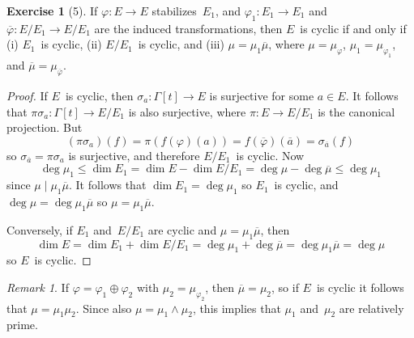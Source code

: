 \documentclass[letterpaper,12pt]{article}
\newcommand{\divides}{\mid}
\newcommand{\meet}{\wedge}
\newcommand{\dsum}{\oplus}
\newcommand{\proj}[1]{\overline{#1}}
\theoremstyle{definition}
\newtheorem*{exer}{Exercise}
\theoremstyle{remark}
\newtheorem*{rmk}{Remark}
\begin{document}
\begin{exer}[5]
If \(\varphi:E\to E\) stabilizes~\(E_1\), and \(\varphi_1:E_1\to E_1\) and \(\proj{\varphi}:E/E_1\to E/E_1\) are the induced transformations, then \(E\)~is cyclic if and only if (i) \(E_1\)~is cyclic, (ii) \(E/E_1\)~is cyclic, and (iii) \(\mu=\mu_1\proj{\mu}\), where \(\mu=\mu_{\varphi}\), \(\mu_1=\mu_{\varphi_1}\), and \(\proj{\mu}=\mu_{\proj{\varphi}}\).
\end{exer}
\begin{proof}
If \(E\)~is cyclic, then \(\sigma_a:\Gamma[t]\to E\) is surjective for some \(a\in E\). It follows that \(\pi\sigma_a:\Gamma[t]\to E/E_1\) is also surjective, where \(\pi:E\to E/E_1\) is the canonical projection. But
\[(\pi\sigma_a)(f)=\pi(f(\varphi)(a))=f(\proj{\varphi})(\proj{a})=\sigma_{\proj{a}}(f)\]
so \(\sigma_{\proj{a}}=\pi\sigma_a\) is surjective, and therefore \(E/E_1\)~is cyclic. Now
\[\deg\mu_1\le\dim E_1=\dim E-\dim E/E_1=\deg\mu-\deg\proj{\mu}\le\deg\mu_1\]
since \(\mu\divides\mu_1\proj{\mu}\). It follows that \(\dim E_1=\deg\mu_1\) so \(E_1\)~is cyclic, and \(\deg\mu=\deg\mu_1\proj{\mu}\) so \(\mu=\mu_1\proj{\mu}\).

Conversely, if \(E_1\) and~\(E/E_1\) are cyclic and \(\mu=\mu_1\proj{\mu}\), then
\[\dim E=\dim E_1+\dim E/E_1=\deg\mu_1+\deg\proj{\mu}=\deg\mu_1\proj{\mu}=\deg\mu\]
so \(E\)~is cyclic.
\end{proof}

\begin{rmk}
If \(\varphi=\varphi_1\dsum\varphi_2\) with \(\mu_2=\mu_{\varphi_2}\), then \(\proj{\mu}=\mu_2\), so if \(E\)~is cyclic it follows that \(\mu=\mu_1\mu_2\). Since also \(\mu=\mu_1\meet\mu_2\), this implies that \(\mu_1\) and~\(\mu_2\) are relatively prime.
\end{rmk}
\end{document}
